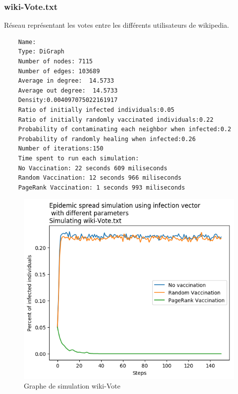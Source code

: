 \documentclass{report}
\begin{document}
\subsubsection{wiki-Vote.txt}
Réseau représentant les votes entre les différents utilisateurs de wikipedia.
\begin{tcolorbox}
  \begin{verbatim}
    Name:
    Type: DiGraph
    Number of nodes: 7115
    Number of edges: 103689
    Average in degree:  14.5733
    Average out degree:  14.5733
    Density:0.004097075022161917
    Ratio of initially infected individuals:0.05
    Ratio of initially randomly vaccinated individuals:0.22
    Probability of contaminating each neighbor when infected:0.2
    Probability of randomly healing when infected:0.26
    Number of iterations:150
    Time spent to run each simulation:
    No Vaccination: 22 seconds 609 miliseconds
    Random Vaccination: 12 seconds 966 miliseconds
    PageRank Vaccination: 1 seconds 993 miliseconds
  \end{verbatim}
\end{tcolorbox}
\begin{figure}[ht!]
  \centering
  \includegraphics[scale=0.7]{../plots/wiki-Vote.png}
  \caption{Graphe de simulation wiki-Vote}
\end{figure}
\end{document}
